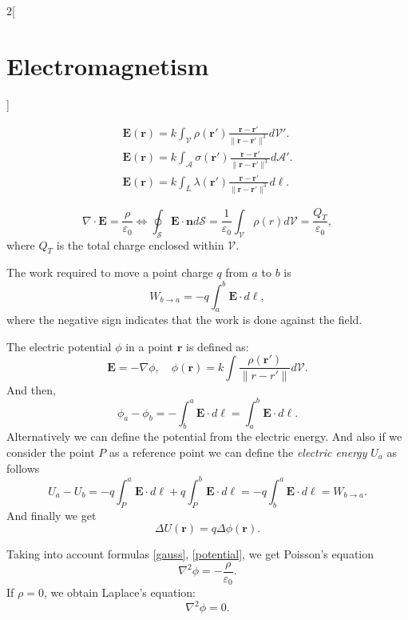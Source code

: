 \documentclass[../../../main.tex]{subfiles}
\begin{document}
\begin{multicols}{2}[\section{Electromagnetism}]
\begin{concept}
\begin{gather*}
    \boldsymbol{E}(\boldsymbol{r})=k\int_\mathcal{V}\rho(\boldsymbol{r}')\frac{\boldsymbol{r}-\boldsymbol{r}'}{\|\boldsymbol{r}-\boldsymbol{r}'\|^3}d\mathcal{V}'.\\
    \boldsymbol{E}(\boldsymbol{r})=k\int_\mathcal{A}\sigma(\boldsymbol{r}')\frac{\boldsymbol{r}-\boldsymbol{r}'}{\|\boldsymbol{r}-\boldsymbol{r}'\|^3}d\mathcal{A}'.\\
    \boldsymbol{E}(\boldsymbol{r})=k\int_L\lambda(\boldsymbol{r}')\frac{\boldsymbol{r}-\boldsymbol{r}'}{\|\boldsymbol{r}-\boldsymbol{r}'\|^3}d\ell.
\end{gather*}
\end{concept}
\begin{concept}
\begin{equation}
    \nabla\cdot\boldsymbol{E}=\frac{\rho}{\varepsilon_0}\iff\oint_\mathcal{S}\boldsymbol{E}\cdot\boldsymbol{n}d\mathcal{S}=\frac{1}{\varepsilon_0}\int_\mathcal{V}\rho(r)d\mathcal{V}=\frac{Q_T}{\varepsilon_0},
    \label{gauss}
\end{equation} where $Q_T$ is the total charge enclosed within $\mathcal{V}$.
\end{concept}
\begin{concept}[Work]
The work required to move a point charge $q$ from $a$ to $b$ is $$W_{b\to a}=-q\int_a^b\boldsymbol{E}\cdot d\ell,$$ where the negative sign indicates that the work is done against the field. 
\end{concept}
\begin{concept}
The electric potential $\phi$ in a point $\boldsymbol{r}$ is defined as: \begin{equation}
    \boldsymbol{E}=-\nabla\phi,\quad\phi(\boldsymbol{r})=k\int\frac{\rho(\boldsymbol{r}')}{\|r-r'\|}d\mathcal{V}.
    \label{potential}
\end{equation} And then, $$\phi_a-\phi_b=-\int_b^a\boldsymbol{E}\cdot d\ell=\int_a^b\boldsymbol{E}\cdot d\ell.$$ Alternatively we can define the potential from the electric energy.  And also if we consider the point $P$ as a reference point we can define the \textit{electric energy} $U_a$ as follows $$U_a-U_b=-q\int_P^a\boldsymbol{E}\cdot d\ell+q\int_P^b\boldsymbol{E}\cdot d\ell=-q\int_b^a\boldsymbol{E}\cdot d\ell=W_{b\to a}.$$ And finally we get $$\Delta U(\boldsymbol{r})=q\Delta\phi(\boldsymbol{r}).$$
\end{concept}
\begin{concept}
Taking into account formulas \ref{gauss}, \ref{potential}, we get Poisson's equation $$\nabla^2\phi=-\frac{\rho}{\varepsilon_0}.$$ If $\rho=0$, we obtain Laplace's equation: $$\nabla^2\phi=0.$$

\end{concept}
\end{multicols}
\end{document}
